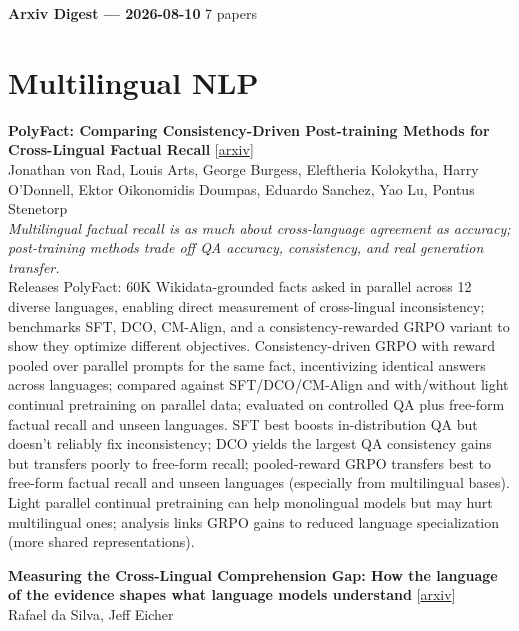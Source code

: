 \documentclass[12pt,letterpaper]{article}
\begin{document}
{\footnotesize\textbf{Arxiv Digest --- 2026-08-10} \hfill 7 papers}

\smallskip

\section*{Multilingual NLP}

{\small\textbf{PolyFact: Comparing Consistency-Driven Post-training Methods for Cross-Lingual Factual Recall}} {\scriptsize[\href{https://arxiv.org/abs/2606.06586}{arxiv}]}\\
{\scriptsize Jonathan von Rad, Louis Arts, George Burgess, Eleftheria Kolokytha, Harry O'Donnell, Ektor Oikonomidis Doumpas, Eduardo Sanchez, Yao Lu, Pontus Stenetorp}\\

{\small\textit{Multilingual factual recall is as much about cross-language agreement as accuracy; post-training methods trade off QA accuracy, consistency, and real generation transfer.}}\\[1pt]
{\footnotesize Releases PolyFact: 60K Wikidata-grounded facts asked in parallel across 12 diverse languages, enabling direct measurement of cross-lingual inconsistency; benchmarks SFT, DCO, CM-Align, and a consistency-rewarded GRPO variant to show they optimize different objectives. Consistency-driven GRPO with reward pooled over parallel prompts for the same fact, incentivizing identical answers across languages; compared against SFT/DCO/CM-Align and with/without light continual pretraining on parallel data; evaluated on controlled QA plus free-form factual recall and unseen languages. SFT best boosts in-distribution QA but doesn't reliably fix inconsistency; DCO yields the largest QA consistency gains but transfers poorly to free-form recall; pooled-reward GRPO transfers best to free-form factual recall and unseen languages (especially from multilingual bases). Light parallel continual pretraining can help monolingual models but may hurt multilingual ones; analysis links GRPO gains to reduced language specialization (more shared representations).}

\medskip

{\small\textbf{Measuring the Cross-Lingual Comprehension Gap: How the language of the evidence shapes what language models understand}} {\scriptsize[\href{https://arxiv.org/abs/2608.06506}{arxiv}]}\\
{\scriptsize Rafael da Silva, Jeff Eicher}\\
\end{document}
